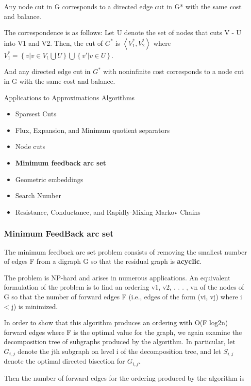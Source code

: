 \begin{frame}
Any node cut in G corresponds to a directed edge cut in G* with the same cost and balance. 
 
The correspondence is as follows: Let U denote the set of nodes that cuts V - U into V1 and V2. 
 Then, the cut of $G^*$ is $\left \langle V^*_1, V^*_2 \right \rangle$  where $V^*_1=\left \{v|v \in V_1 \bigcup U\right \} \bigcup \left \{v'|v \in U \right \}$.
 
 And any directed edge cut in $G^*$ with noninfinite cost corresponds to a node cut in G with the same cost and balance. 
\end{frame}


\begin{frame}[t]
\begin{block}{Applications to Approximations Algorithms}
	\begin{itemize}
			\item Sparsest Cuts
            \item Flux, Expansion, and Minimum quotient separators
            \item Node cuts
			\item \textbf{Minimum feedback arc set}
            \item Geometric embeddings
        	\item Search Number
            \item Resistance, Conductance, and Rapidly-Mixing Markov Chains
	 \end{itemize} 
\end{block}
\end{frame}

\begin{frame}
\frametitle{Minimum FeedBack arc set}
The minimum feedback arc set problem
consists of removing the smallest number of edges F from a digraph G so that
the residual graph is \textbf{acyclic}. 

The problem is NP-hard and arises in numerous
applications.
An equivalent formulation of the problem is to find an ordering v1, v2, . . . , vn
of the nodes of G so that the number of forward edges F (i.e., edges of the form
(vi, vj) where i < j) is minimized. 
\end{frame}

\begin{frame}
In order to show that this algorithm produces an ordering with O(F log2n) forward edges where F is the optimal value for the graph, we again
examine the decomposition tree of subgraphs produced by the algorithm. In
particular, let $G_{i,j}$ denote the jth subgraph on level i of the decomposition tree,
and let $S_{i,j}$ denote the optimal directed bisection for $G_{i,j}$. 

Then the number of forward edges for the ordering produced by the algorithm is
\end{frame}

